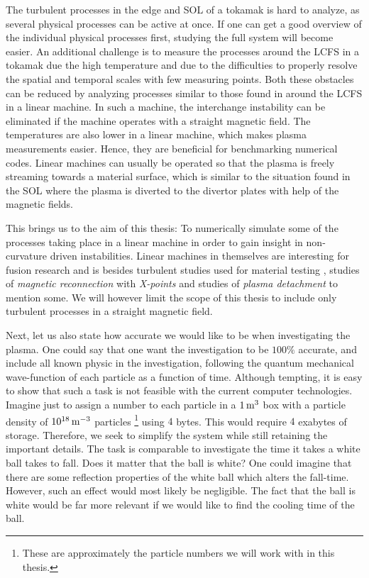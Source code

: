 The turbulent processes in the edge and SOL of a tokamak is hard to analyze, as several physical processes can be active at once.
If one can get a good overview of the individual physical processes first, studying the full system will become easier.
An additional challenge is to measure the processes around the LCFS in a tokamak due the high temperature and due to the difficulties to properly resolve the spatial and temporal scales with few measuring points.
Both these obstacles can be reduced by analyzing processes similar to those found in around the LCFS in a linear machine.
In such a machine, the interchange instability can be eliminated if the machine operates with a straight magnetic field.
The temperatures are also lower in a linear machine, which makes plasma measurements easier.
Hence, they are beneficial for benchmarking numerical codes.
Linear machines can usually be operated so that the plasma is freely streaming towards a material surface, which is similar to the situation found in the SOL where the plasma is diverted to the divertor plates with help of the magnetic fields.

This brings us to the aim of this thesis:
To numerically simulate some of the processes taking place in a linear machine in order to gain insight in non-curvature driven instabilities.
Linear machines in themselves are interesting for fusion research and is besides turbulent studies used for material testing \cite{Rapp2010}, studies of \emph{magnetic reconnection} with \emph{X-points} \cite{Bohlin2014} and studies of \emph{plasma detachment} \cite{Ohno2017} to mention some.
We will however limit the scope of this thesis to include only turbulent processes in a straight magnetic field.

Next, let us also state how accurate we would like to be when investigating the plasma.
One could say that one want the investigation to be $100 \%$ accurate, and include all known physic in the investigation, following the quantum mechanical wave-function of each particle as a function of time.
Although tempting, it is easy to show that such a task is not feasible with the current computer technologies.
Imagine just to assign a number to each particle in a $1\, \text{m}^3$ box with a particle density of $10^{18} \, \text{m}^{-3}$ particles%
\footnote{These are approximately the particle numbers we will work with in this thesis.}%
%
using $4$ bytes.
This would require $4$ exabytes of storage.
Therefore, we seek to simplify the system while still retaining the important details.
The task is comparable to investigate the time it takes a white ball takes to fall.
Does it matter that the ball is white?
One could imagine that there are some reflection properties of the white ball which alters the fall-time.
However, such an effect would most likely be negligible.
The fact that the ball is white would be far more relevant if we would like to find the cooling time of the ball.

